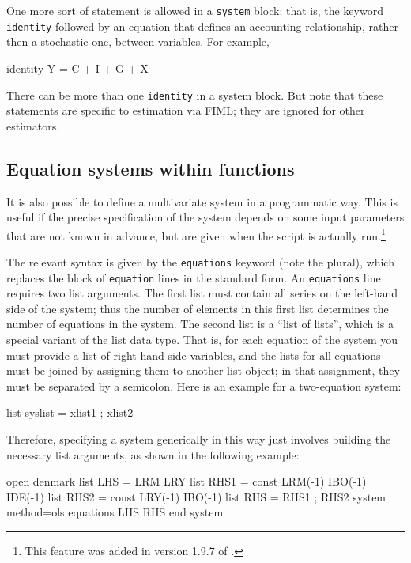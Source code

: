 One more sort of statement is allowed in a \texttt{system} block: that
is, the keyword \texttt{identity} followed by an equation that defines
an accounting relationship, rather then a stochastic one, between
variables. For example,

\begin{code}
  identity Y = C + I + G + X
\end{code}

There can be more than one \texttt{identity} in a system block. But
note that these statements are specific to estimation via FIML; they
are ignored for other estimators.

\subsection{Equation systems within functions}

It is also possible to define a multivariate system in a programmatic
way. This is useful if the precise specification of the system depends
on some input parameters that are not known in advance, but are given
when the script is actually run.\footnote{This feature was added in
  version 1.9.7 of .}

The relevant syntax is given by the \texttt{equations} keyword (note
the plural), which replaces the block of \texttt{equation} lines in
the standard form. An \texttt{equations} line requires two list
arguments. The first list must contain all series on the left-hand
side of the system; thus the number of elements in this first list
determines the number of equations in the system. The second list is a
``list of lists'', which is a special variant of the list data type.
That is, for each equation of the system you must provide a list of
right-hand side variables, and the lists for all equations must be
joined by assigning them to another list object; in that assignment,
they must be separated by a semicolon.  Here is an example for a
two-equation system:

\begin{code}
list syslist = xlist1 ; xlist2
\end{code}

Therefore, specifying a system generically in this way just involves 
building the necessary list arguments, as shown in the following
example:

\begin{code}
open denmark
list LHS = LRM LRY
list RHS1 = const LRM(-1) IBO(-1) IDE(-1)
list RHS2 = const LRY(-1) IBO(-1)
list RHS = RHS1 ; RHS2
system method=ols
     equations LHS RHS
end system
\end{code}

